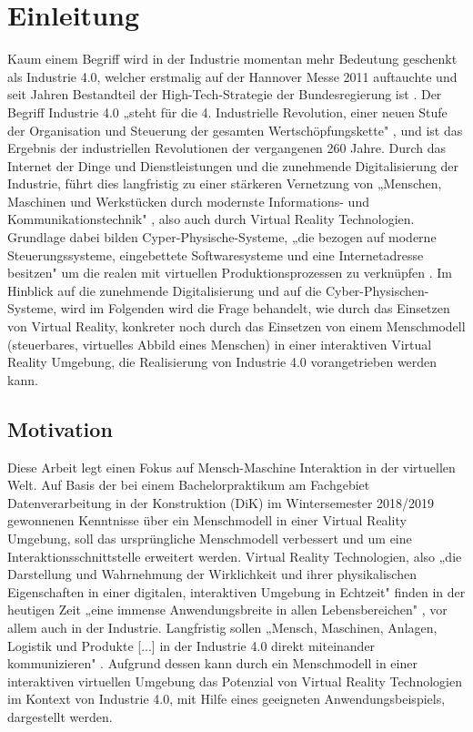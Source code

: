 \chapter{Einleitung} \label{cha:Einleitung}	

Kaum einem Begriff wird in der Industrie momentan mehr Bedeutung geschenkt als Industrie 4.0, welcher erstmalig auf der Hannover Messe 2011 auftauchte und seit Jahren Bestandteil der High-Tech-Strategie der Bundesregierung ist \cite{8}. Der Begriff Industrie 4.0 „steht für die 4. Industrielle Revolution, einer neuen Stufe der Organisation und Steuerung der gesamten Wertschöpfungskette" \cite{1} , und ist das Ergebnis der industriellen Revolutionen der vergangenen 260 Jahre. Durch das Internet der Dinge und Dienstleistungen und die zunehmende Digitalisierung der Industrie, führt dies langfristig zu einer stärkeren Vernetzung von „Menschen, Maschinen und Werkstücken durch modernste Informations- und Kommunikationstechnik" \cite{6}, also auch durch Virtual Reality Technologien. Grundlage dabei bilden Cyper-Physische-Systeme, „die bezogen auf moderne Steuerungssysteme, eingebettete Softwaresysteme und eine Internetadresse besitzen" \cite{1} um die realen mit virtuellen Produktionsprozessen zu verknüpfen \cite{11}.
\newline
Im Hinblick auf die zunehmende Digitalisierung und auf die Cyber-Physischen-Systeme, wird im Folgenden wird die Frage behandelt, wie durch das Einsetzen von Virtual Reality, konkreter noch durch das Einsetzen von einem Menschmodell (steuerbares, virtuelles Abbild eines Menschen) in einer interaktiven Virtual Reality Umgebung, die Realisierung von Industrie 4.0 vorangetrieben werden kann.

\section{Motivation}\label{sec:Motivation}
Diese Arbeit legt einen Fokus auf Mensch-Maschine Interaktion in der virtuellen Welt. Auf Basis der bei einem Bachelorpraktikum am Fachgebiet Datenverarbeitung in der Konstruktion (DiK) im Wintersemester 2018/2019 gewonnenen Kenntnisse über ein Menschmodell in einer Virtual Reality Umgebung, soll das ursprüngliche Menschmodell verbessert und um eine Interaktionsschnittstelle erweitert werden.
\newline
Virtual Reality Technologien, also „die Darstellung und Wahrnehmung der Wirklichkeit und ihrer physikalischen Eigenschaften in einer digitalen, interaktiven Umgebung in Echtzeit" \cite[S.1]{4} finden in der heutigen Zeit „eine immense Anwendungsbreite in allen Lebensbereichen" \cite[S.1]{4}, vor allem auch in der Industrie. Langfristig sollen „Mensch, Maschinen, Anlagen, Logistik und Produkte [...] in der Industrie 4.0 direkt miteinander kommunizieren" \cite[S.2]{4}.
\newline
Aufgrund dessen kann durch ein Menschmodell in einer interaktiven virtuellen Umgebung das Potenzial von Virtual Reality Technologien im Kontext von Industrie 4.0, mit Hilfe eines geeigneten Anwendungsbeispiels, dargestellt werden.

